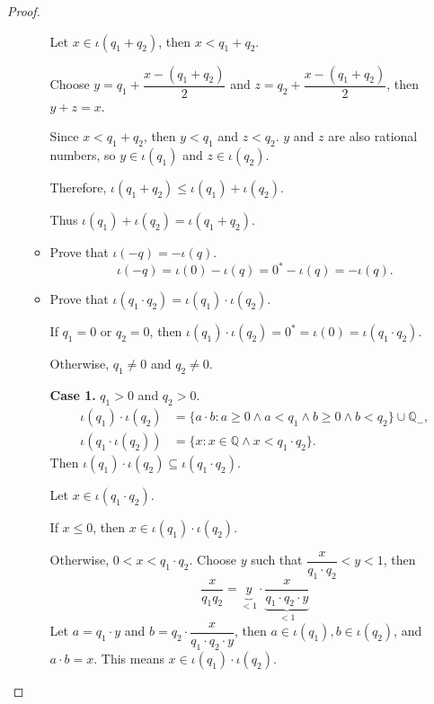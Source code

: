 \begin{proof}
\begin{itemize}
\begin{itemize}
                        Let $x\in\iota(q_{1} + q_{2})$, then $x < q_{1} + q_{2}$.

                        Choose $y = q_{1} + \dfrac{x - (q_{1} + q_{2})}{2}$ and $z = q_{2} + \dfrac{x - (q_{1} + q_{2})}{2}$, then $y + z = x$.

                        Since $x < q_{1} + q_{2}$, then $y < q_{1}$ and $z < q_{2}$. $y$ and $z$ are also rational numbers, so $y\in\iota(q_{1})$ and $z\in\iota(q_{2})$.

                        Therefore, $\iota(q_{1} + q_{2})\le\iota(q_{1}) + \iota(q_{2})$.

                        Thus $\iota(q_{1}) + \iota(q_{2}) = \iota(q_{1} + q_{2})$.
                  \item Prove that $\iota(-q) = - \iota(q)$.
                        \[
                            \iota(-q) = \iota(0) - \iota(q) = {0}^{*} - \iota(q) = -\iota(q).
                        \]
                  \item Prove that $\iota(q_{1}\cdot q_{2}) = \iota(q_{1})\cdot\iota(q_{2})$.

                        If $q_{1} = 0$ or $q_{2} = 0$, then $\iota(q_{1})\cdot\iota(q_{2}) = {0}^{*} = \iota(0) = \iota(q_{1}\cdot q_{2})$.

                        Otherwise, $q_{1}\ne 0$ and $q_{2}\ne 0$.

                        \textbf{Case 1.} $q_{1} > 0$ and $q_{2} > 0$.
                        \[
                            \begin{split}
                                \iota(q_{1})\cdot\iota(q_{2}) & = \{ a\cdot b : a\ge 0\land a < q_{1}\land b\ge 0\land b < q_{2} \}\cup\mathbb{Q}_{-}, \\
                                \iota(q_{1}\cdot\iota(q_{2})) & = \{ x: x\in\mathbb{Q}\land x < q_{1}\cdot q_{2} \}.
                            \end{split}
                        \]
                        Then $\iota(q_{1})\cdot\iota(q_{2})\subseteq\iota(q_{1}\cdot q_{2})$.

                        Let $x\in\iota(q_{1}\cdot q_{2})$.

                        If $x\le 0$, then $x\in\iota(q_{1})\cdot\iota(q_{2})$.

                        Otherwise, $0 < x < q_{1}\cdot q_{2}$. Choose $y$ such that $\dfrac{x}{q_{1}\cdot q_{2}} < y < 1$, then
                        \[
                            \dfrac{x}{q_{1}q_{2}} = \underbrace{y}_{< 1}\cdot\underbrace{\dfrac{x}{q_{1}\cdot q_{2}\cdot y}}_{< 1}
                        \]
                        Let $a = q_{1}\cdot y$ and $b = q_{2}\cdot\dfrac{x}{q_{1}\cdot q_{2}\cdot y}$, then $a\in\iota(q_{1}), b\in\iota(q_{2})$, and $a\cdot b = x$. This means $x\in\iota(q_{1})\cdot\iota(q_{2})$.


\end{itemize}
\end{itemize}
\end{proof}
